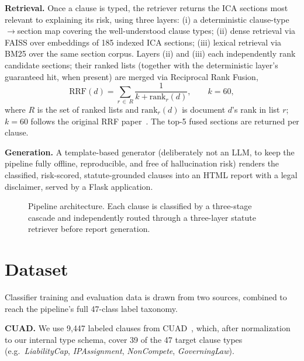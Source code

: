 \documentclass[conference]{IEEEtran}
\begin{document}
\textbf{Retrieval.} Once a clause is typed, the retriever returns the ICA sections most relevant to explaining its risk, using three layers: (i) a deterministic clause-type$\rightarrow$section map covering the well-understood clause types; (ii) dense retrieval via FAISS over embeddings of 185 indexed ICA sections; (iii) lexical retrieval via BM25 over the same section corpus. Layers (ii) and (iii) each independently rank candidate sections; their ranked lists (together with the deterministic layer's guaranteed hit, when present) are merged via Reciprocal Rank Fusion,
\begin{equation}
\mathrm{RRF}(d) = \sum_{r \,\in\, R} \frac{1}{k + \mathrm{rank}_r(d)}, \qquad k = 60,
\label{eq:rrf}
\end{equation}
where $R$ is the set of ranked lists and $\mathrm{rank}_r(d)$ is document $d$'s rank in list $r$; $k=60$ follows the original RRF paper~\cite{rrf2009}. The top-5 fused sections are returned per clause.

\textbf{Generation.} A template-based generator (deliberately not an LLM, to keep the pipeline fully offline, reproducible, and free of hallucination risk) renders the classified, risk-scored, statute-grounded clauses into an HTML report with a legal disclaimer, served by a Flask application.

\begin{figure}[t]
\centering

\caption{Pipeline architecture. Each clause is classified by a three-stage cascade and independently routed through a three-layer statute retriever before report generation.}
\label{fig:architecture}
\end{figure}

\section{Dataset}
\label{sec:dataset}

Classifier training and evaluation data is drawn from two sources, combined to reach the pipeline's full 47-class label taxonomy.

\textbf{CUAD.} We use 9{,}447 labeled clauses from CUAD~\cite{cuad2021}, which, after normalization to our internal type schema, cover 39 of the 47 target clause types (e.g.\ \textit{LiabilityCap}, \textit{IPAssignment}, \textit{NonCompete}, \textit{GoverningLaw}).
\end{document}

